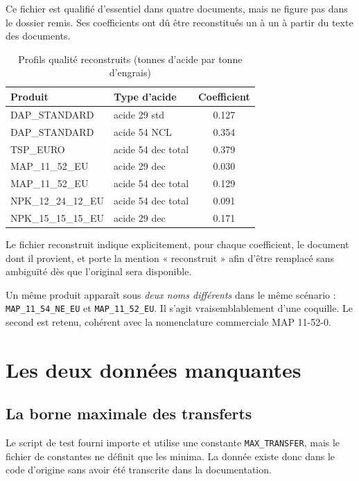 Ce fichier est qualifié d'essentiel dans quatre documents, mais ne figure pas dans le
dossier remis. Ses coefficients ont dû être reconstitués un à un à partir du texte des
documents.

\begin{table}[H]
\centering
\caption{Profils qualité reconstruits (tonnes d'acide par tonne d'engrais)}
\label{tab:profils}
\begin{tabular}{@{}llS[table-format=1.3]@{}}
\toprule
\textbf{Produit} & \textbf{Type d'acide} & {\textbf{Coefficient}} \\
\midrule
DAP\_STANDARD & acide 29 std & 0.127 \\
DAP\_STANDARD & acide 54 NCL & 0.354 \\
TSP\_EURO & acide 54 dec total & 0.379 \\
MAP\_11\_52\_EU & acide 29 dec & 0.030 \\
MAP\_11\_52\_EU & acide 54 dec total & 0.129 \\
NPK\_12\_24\_12\_EU & acide 54 dec total & 0.091 \\
NPK\_15\_15\_15\_EU & acide 29 dec & 0.171 \\
\bottomrule
\end{tabular}
\end{table}

Le fichier reconstruit indique explicitement, pour chaque coefficient, le document dont il
provient, et porte la mention « reconstruit » afin d'être remplacé sans ambiguïté dès que
l'original sera disponible.

\begin{encadre}[title={Alerte supplémentaire}]
Un même produit apparaît sous \emph{deux noms différents} dans le même scénario :
\texttt{MAP\_11\_54\_NE\_EU} et \texttt{MAP\_11\_52\_EU}. Il s'agit vraisemblablement d'une
coquille. Le second est retenu, cohérent avec la nomenclature commerciale MAP 11-52-0.
\end{encadre}

\section{Les deux données manquantes}

\subsection{La borne maximale des transferts}

Le script de test fourni importe et utilise une constante \texttt{MAX\_TRANSFER}, mais le
fichier de constantes ne définit que les minima. La donnée existe donc dans le code
d'origine sans avoir été transcrite dans la documentation.

